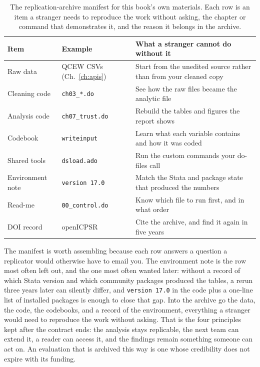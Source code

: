 \documentclass[
    a4paper,
    fontsize=10pt,
    twoside=true,
    numbers=noenddot,
]{kaobook}
\begin{document}
\begin{table}[htbp]
\centering
\caption[A replication-archive manifest]{The replication-archive manifest for this book's own materials. Each row is an item a stranger needs to reproduce the work without asking, the chapter or command that demonstrates it, and the reason it belongs in the archive.}
\label{tab:manifest}
\begin{tabular}{@{}p{3.0cm}p{3.4cm}p{8.4cm}@{}}
\hline
Item & Example & What a stranger cannot do without it \\
\hline
Raw data          & QCEW CSVs (Ch.~\ref{ch:apis})  & Start from the unedited source rather than from your cleaned copy \\
Cleaning code     & \texttt{ch03\_*.do}  & See how the raw files became the analytic file \\
Analysis code     & \texttt{ch07\_trust.do} & Rebuild the tables and figures the report shows \\
Codebook          & \texttt{writeinput}  & Learn what each variable contains and how it was coded \\
Shared tools      & \texttt{dsload.ado}  & Run the custom commands your do-files call \\
Environment note  & \texttt{version 17.0} & Match the Stata and package state that produced the numbers \\
Read-me           & \texttt{00\_control.do} & Know which file to run first, and in what order \\
DOI record        & openICPSR            & Cite the archive, and find it again in five years \\
\hline
\end{tabular}
\end{table}

The manifest is worth assembling because each row answers a question a replicator would otherwise have to email you. The environment note is the row most often left out, and the one most often wanted later: without a record of which Stata version and which community packages produced the tables, a rerun three years later can silently differ, and \texttt{version 17.0} in the code plus a one-line list of installed packages is enough to close that gap. Into the archive go the data, the code, the codebooks, and a record of the environment, everything a stranger would need to reproduce the work without asking. That is the four principles kept after the contract ends: the analysis stays replicable, the next team can extend it, a reader can access it, and the findings remain something someone can act on. An evaluation that is archived this way is one whose credibility does not expire with its funding.
\end{document}
